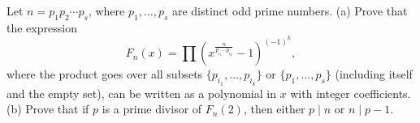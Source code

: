Let $n=p_1p_2\cdots p_s$, where $p_1,\ldots,p_s$ are distinct odd prime numbers.
(a) Prove that the expression
$$F_n(x)=\prod\left(x^{\frac n{p_{i_1}\cdots p_{i_k}}}-1\right)^{(-1)^k},$$where the product goes over all subsets $\{p_{i_1},\ldots,p_{i_k}\}$ or $\{p_1,\ldots,p_s\}$ (including itself and the empty set), can be written as a polynomial in $x$ with integer coefficients.
(b) Prove that if $p$ is a prime divisor of $F_n(2)$, then either $p\mid n$ or $n\mid p-1$.